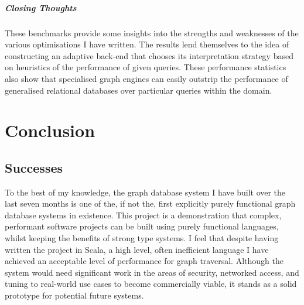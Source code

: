 \documentclass[12pt,a4paper,twoside,openright]{report}
\begin{document}
			\paragraph{Closing Thoughts}
			These benchmarks provide some insights into the strengths and weaknesses of the various optimisations I have written. The results lend themselves to the idea of constructing an adaptive back-end that chooses its interpretation strategy based on heuristics of the performance of given queries. These performance statistics also show that specialised graph engines can easily outstrip the performance of generalised relational databases over particular queries within the domain.


	
\chapter{Conclusion}

\section{Successes}
To the best of my knowledge, the graph database system I have built over the last seven months is one of the, if not the, first explicitly purely functional graph database systems in existence. This project is a demonstration that complex, performant software projects can be built using purely functional languages, whilst keeping the benefits of strong type systems. I feel that despite having written the project in Scala, a high level, often inefficient language I have achieved an acceptable level of performance for graph traversal. Although the system would need significant work in the areas of security, networked access, and tuning to real-world use cases to become commercially viable, it stands as a solid prototype for potential future systems.
\end{document}
